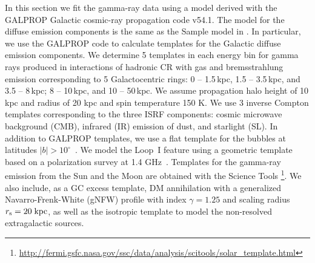 In this section we fit the gamma-ray data using a model derived with the GALPROP
Galactic cosmic-ray propagation code v54.1.
The model for the diffuse emission components is the same as the Sample model in \cite{2017ApJ...840...43A}.
In particular, we use the GALPROP code to calculate templates for the Galactic diffuse emission components.
We determine 5 templates in each energy bin for gamma rays produced in 
interactions of hadronic CR with gas and bremsstrahlung emission corresponding to 5 Galactocentric rings: 
0 -- 1.5\,kpc, 1.5 -- 3.5\,kpc, and 3.5 -- 8\,kpc; 8 -- 10\,kpc, and 10 -- 50\,kpc.
We assume propagation halo height of 10 kpc and radius of 20 kpc and spin temperature 150 K.
We use 3 inverse Compton templates corresponding to the three ISRF components: cosmic microwave background (CMB), 
infrared (IR) emission of dust, and starlight (SL).
In addition to GALPROP templates, we use a flat template for the \Fermi bubbles at latitudes $|b| > 10^\circ$~\citep{2014ApJ...793...64A}. 
We model the Loop~I feature using a geometric template \citep[e.g., Figure 2 of][]{2014ApJ...793...64A}
based on a polarization survey at 1.4 GHz~\citep{Wolleben:2007pq}.
Templates for the gamma-ray emission from the Sun  and the Moon
\citep{2008A&A...480..847O, 2011ApJ...734..116A, 2013arXiv1307.0197J, 2016PhRvD..93h2001A}
are obtained with the \Fermi Science Tools%
\footnote{\url{http://fermi.gsfc.nasa.gov/ssc/data/analysis/scitools/solar_template.html}}.
We also include, as a GC excess template, 
DM annihilation with a generalized Navarro-Frenk-White (gNFW) profile with index $\gamma = 1.25$ 
\citep{Goodenough:2009gk,Abazajian:2014fta, Calore:2014xka}
and scaling radius $r_{\rm s} = 20\;{\rm kpc}$, as well as the isotropic template to model the non-resolved 
extragalactic sources.


